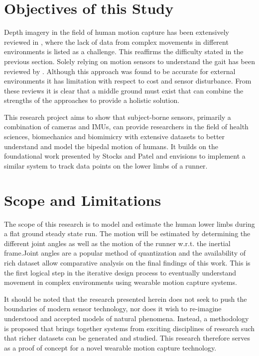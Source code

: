 \section{Objectives of this Study}
Depth imagery in the field of human motion capture has been extensively reviewed in \cite{chen2013survey}, where the lack of data from complex movements in different environments is listed as a challenge. This reaffirms the difficulty stated in the previous section.  Solely relying on motion sensors to understand the gait has been reviewed by \cite{picerno201725}. Although this approach was found to be accurate for external environments it has limitation with respect to cost and sensor disturbance. From these reviews it is clear that a middle ground must exist that can combine the strengths of the approaches to provide a holistic solution.

This research project aims to show that subject-borne sensors, primarily a combination of cameras and IMUs, can provide researchers in the field of health sciences, biomechanics and biomimicry with extensive datasets to better understand and model the bipedal motion of humans. It builds on the foundational work presented by Stocks and Patel \cite{bradstocks} and envisions to implement a similar system to track data points on the lower limbs of a runner.



\section{Scope and Limitations}
The scope of this research is to model and estimate the human lower limbs during a flat ground steady state run. The motion will be estimated by determining the different joint angles as well as the motion of the runner w.r.t. the inertial frame.Joint angles are a popular method of quantization and the availability of rich dataset allow comparative analysis on the final findings of this work. This is the first logical step in the iterative design process to eventually understand movement in complex environments using wearable motion capture systems.

It should be noted that the research presented herein does not seek to push the boundaries of modern sensor technology, nor does it wish to re-imagine understood and accepted models of natural phenomena. Instead, a methodology is proposed that brings together systems from exciting disciplines of research such that richer datasets can be generated and studied. This research therefore serves as a proof of concept for a novel wearable motion capture technology.

